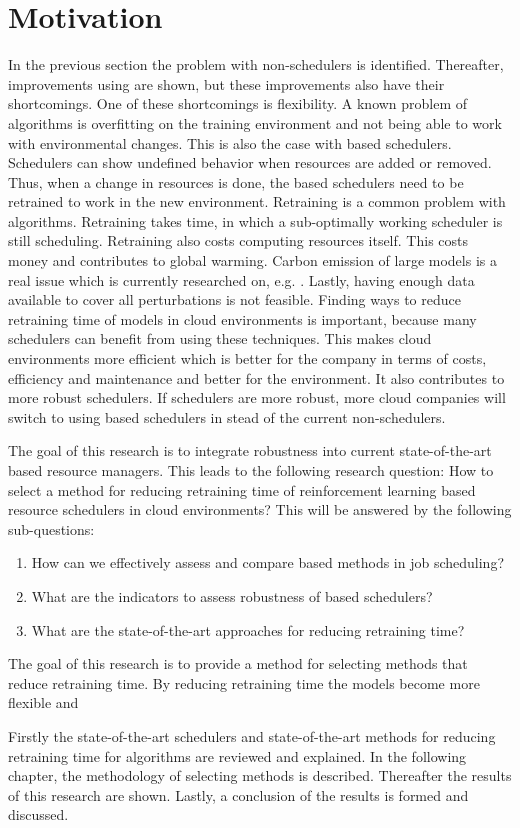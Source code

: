 \section{Motivation}

In the previous section the problem with non-\ai schedulers is identified.
Thereafter, improvements using \rl are shown, but these \rl improvements also
have their shortcomings. One of these shortcomings is flexibility. A known
problem of \ml algorithms is overfitting on the training environment and not
being able to work with environmental changes. This is also the case with \rl
based schedulers. Schedulers can show undefined behavior when resources are
added or removed. Thus, when a change in resources is done, the \rl based
schedulers need to be retrained to work in the new environment. Retraining is
a common problem with \ml algorithms. Retraining takes time, in which a
sub-optimally working scheduler is still scheduling. Retraining also costs
computing resources itself. This costs money and contributes to global
warming. Carbon emission of large \ml models is a real issue which is
currently researched on, e.g. . Lastly, having enough
data available to cover all perturbations is not feasible. Finding ways to
reduce retraining time of \rl models in cloud environments is important,
because many schedulers can benefit from using these techniques. This makes
cloud environments more efficient which is better for the company in terms of
costs, efficiency and maintenance and better for the environment. It also
contributes to more robust \rl schedulers. If \rl schedulers are more robust,
more cloud companies will switch to using \rl based schedulers in stead of the
current non-\ai schedulers.

The goal of this research is to integrate robustness into current
state-of-the-art \ml based resource managers. This leads to the following
research question: How to select a method for reducing retraining time of
reinforcement learning based resource schedulers in cloud environments? This
will be answered by the following sub-questions:

\begin{enumerate}
    \item How can we effectively assess and compare \rl based methods in job
        scheduling?
    \item What are the indicators to assess robustness of \rl based schedulers?
    \item What are the state-of-the-art approaches for reducing retraining time?
\end{enumerate}

The goal of this research is to provide a method for selecting methods that
reduce retraining time. By reducing retraining time the models become more
flexible and

Firstly the state-of-the-art \rl schedulers and state-of-the-art methods for
reducing retraining time for \rl algorithms are reviewed and explained. In the
following chapter, the methodology of selecting methods is described.
Thereafter the results of this research are shown. Lastly, a conclusion of the
results is formed and discussed.
